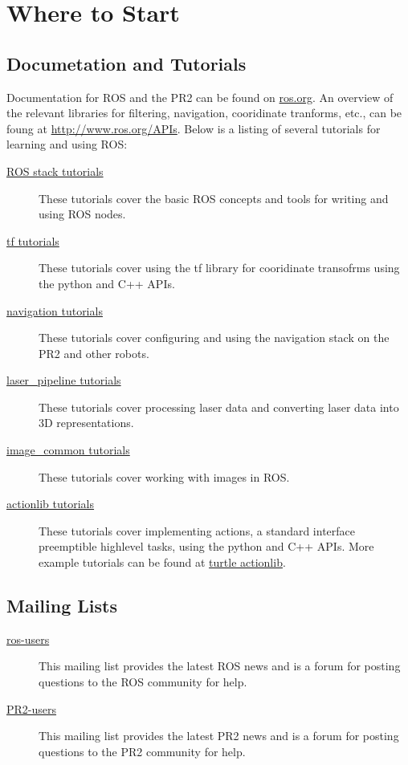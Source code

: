\section{Where to Start}
\subsection{Documetation and Tutorials}
Documentation for ROS and the PR2 can be found on \href{http://www.ros.org}{ros.org}. An overview 
of the relevant libraries for filtering, navigation, cooridinate tranforms, etc., can be foung at 
\href{http://www.ros.org/APIs}{http://www.ros.org/APIs}. Below is a listing of several tutorials 
for learning and using ROS:
\begin{description}
\item[\href{http://www.ros.org/wiki/ROS/Tutorials}{ROS stack tutorials}] These tutorials cover the
basic ROS concepts and tools for writing and using ROS nodes.
\item[\href{http://www.ros.org/wiki/tf/Tutorials}{tf tutorials}] These tutorials cover using the tf 
library for cooridinate transofrms using the python and C++ APIs.
\item[\href{http://www.ros.org/wiki/navigation/Tutorials}{navigation tutorials}] These tutorials 
cover configuring and using the navigation stack on the PR2 and other robots.
\item[\href{http://www.ros.org/wiki/laser_pipeline/Tutorials}{laser\_pipeline tutorials}] These tutorials 
cover processing laser data and converting laser data into 3D representations.
\item[\href{http://www.ros.org/wiki/image_common/Tutorials}{image\_common tutorials}] These tutorials 
cover working with images in ROS.
\item[\href{http://www.ros.org/wiki/actionlib_tutorials/Tutorials}{actionlib tutorials}] These 
tutorials cover implementing actions, a standard interface preemptible highlevel tasks, using 
the python and C++ APIs. More example tutorials can be found at 
\href{http://www.ros.org/wiki/turtle_actionlib}{turtle actionlib}.
\end{description}

\subsection{Mailing Lists}
\begin{description}
\item[\href{https://lists.sourceforge.net/lists/listinfo/ros-users}{ros-users}] This mailing list 
provides the latest ROS news and is a forum for posting questions to the ROS community for help. 
\item[\href{http://lists.willowgarage.com/cgi-bin/mailman/listinfo/pr2-users}{PR2-users}] This 
mailing list provides the latest PR2 news and is a forum for posting questions to the PR2 community 
for help.
\end{description}


